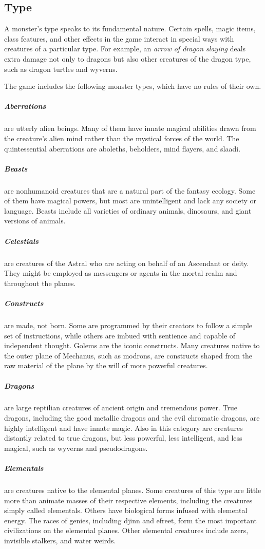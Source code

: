 \subsection{Type}

A monster's type speaks to its fundamental nature. Certain spells, magic items, class features, and other effects in the game interact in special ways with creatures of a particular type. For example, an \textit{arrow of dragon slaying} deals extra damage not only to dragons but also other creatures of the dragon type, such as dragon turtles and wyverns.

The game includes the following monster types, which have no rules of their own.

\subparagraph*{Aberrations} are utterly alien beings. Many of them have innate magical abilities drawn from the creature's alien mind rather than the mystical forces of the world. The quintessential aberrations are aboleths, beholders, mind flayers, and slaadi.

\subparagraph*{Beasts} are nonhumanoid creatures that are a natural part of the fantasy ecology. Some of them have magical powers, but most are unintelligent and lack any society or language. Beasts include all varieties of ordinary animals, dinosaurs, and giant versions of animals.

\subparagraph*{Celestials} are creatures of the Astral who are acting on behalf of an Ascendant or deity. They might be employed as messengers or agents in the mortal realm and throughout the planes.

\subparagraph*{Constructs} are made, not born. Some are programmed by their creators to follow a simple set of instructions, while others are imbued with sentience and capable of independent thought. Golems are the iconic constructs. Many creatures native to the outer plane of Mechanus, such as modrons, are constructs shaped from the raw material of the plane by the will of more powerful creatures.

\subparagraph*{Dragons} are large reptilian creatures of ancient origin and tremendous power. True dragons, including the good metallic dragons and the evil chromatic dragons, are highly intelligent and have innate magic. Also in this category are creatures distantly related to true dragons, but less powerful, less intelligent, and less magical, such as wyverns and pseudodragons.

\subparagraph*{Elementals} are creatures native to the elemental planes. Some creatures of this type are little more than animate masses of their respective elements, including the creatures simply called elementals. Others have biological forms infused with elemental energy. The races of genies, including djinn and efreet, form the most important civilizations on the elemental planes. Other elemental creatures include azers, invisible stalkers, and water weirds.

